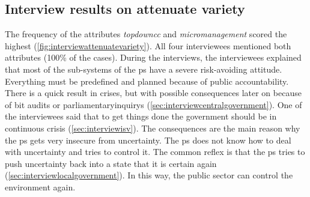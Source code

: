 \subsection{Interview results on attenuate variety}
\label{sub:interviewresultsattenuate}
The frequency of the attributes \textit{\gls{topdowncc}} and \textit{\gls{micromanagement}} scored the highest (\cref{fig:interviewattenuatevariety}). All four interviewees mentioned both \glspl{attribute} (100\% of the cases). During the interviews, the interviewees explained that most of the sub-systems of the \gls{ps} have a severe risk-avoiding attitude. Everything must be predefined and planned because of public accountability. There is a quick result in crises, but with possible consequences later on because of \acrfull{bit} audits or \glspl{parliamentaryinquiry} (\cref{sec:interviewcentralgovernment}). One of the interviewees said that to get things done the government should be in continuous crisis (\cref{sec:interviewisv}). The consequences are the main reason why the \gls{ps} gets very insecure from \gls{uncertainty}. The \gls{ps} does not know how to deal with \gls{uncertainty} and tries to control it. The common reflex is that the \gls{ps} tries to push \gls{uncertainty} back into a state that it is certain again (\cref{sec:interviewlocalgovernment}). In this way, the public sector can control the environment again.
